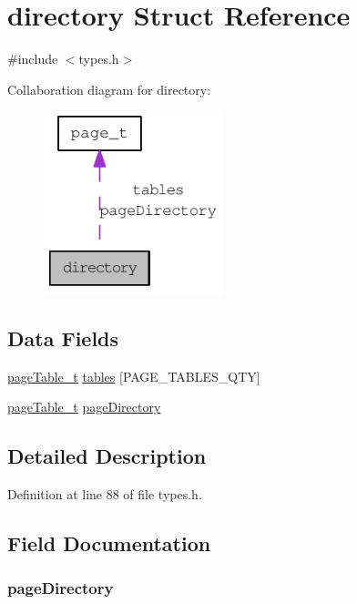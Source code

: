 \hypertarget{structdirectory}{
\section{directory Struct Reference}
\label{structdirectory}
}


{\ttfamily \#include $<$types.h$>$}



Collaboration diagram for directory:\nopagebreak
\begin{figure}[H]
\begin{center}
\leavevmode
\includegraphics[width=148pt]{structdirectory__coll__graph}
\end{center}
\end{figure}
\subsection*{Data Fields}
\begin{DoxyCompactItemize}
\item 
\hyperlink{structpage_table__t}{pageTable\_\-t} \hyperlink{structdirectory_a3e0d7ce1ada814ee34fecb417f482914}{tables} \mbox{[}PAGE\_\-TABLES\_\-QTY\mbox{]}
\item 
\hyperlink{structpage_table__t}{pageTable\_\-t} \hyperlink{structdirectory_ace546e6a880b7429f91ee63ec5b6f4ca}{pageDirectory}
\end{DoxyCompactItemize}


\subsection{Detailed Description}


Definition at line 88 of file types.h.



\subsection{Field Documentation}
\hypertarget{structdirectory_ace546e6a880b7429f91ee63ec5b6f4ca}{
\subsubsection[{pageDirectory}]{ {\bf pageDirectory}}}
\label{structdirectory_ace546e6a880b7429f91ee63ec5b6f4ca}


